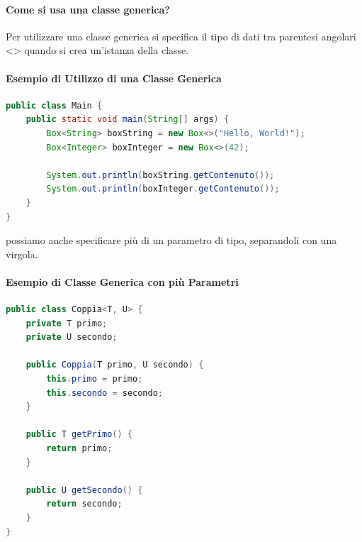 \documentclass[11pt]{article}
\begin{document}
\paragraph{Come si usa una classe generica?}
Per utilizzare una classe generica si specifica il tipo di dati tra parentesi angolari <> quando si crea un'istanza della classe.
\paragraph{Esempio di Utilizzo di una Classe Generica}
\begin{lstlisting}[language=Java]
public class Main {
    public static void main(String[] args) {
        Box<String> boxString = new Box<>("Hello, World!");
        Box<Integer> boxInteger = new Box<>(42);

        System.out.println(boxString.getContenuto());
        System.out.println(boxInteger.getContenuto());
    }
}
\end{lstlisting}
possiamo anche specificare più di un parametro di tipo, separandoli con una virgola.
\paragraph{Esempio di Classe Generica con più Parametri}
\begin{lstlisting}[language=Java]
public class Coppia<T, U> {
    private T primo;
    private U secondo;

    public Coppia(T primo, U secondo) {
        this.primo = primo;
        this.secondo = secondo;
    }

    public T getPrimo() {
        return primo;
    }

    public U getSecondo() {
        return secondo;
    }
}
\end{lstlisting}
\end{document}
